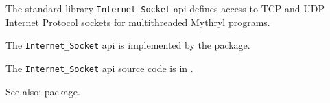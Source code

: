 
The standard library {\tt Internet\_Socket} api defines access to TCP and UDP Internet Protocol sockets for multithreaded Mythryl programs.

The {\tt Internet\_Socket} api is implemented by the  package.

The {\tt Internet\_Socket} api source code is in .

See also:   package.

